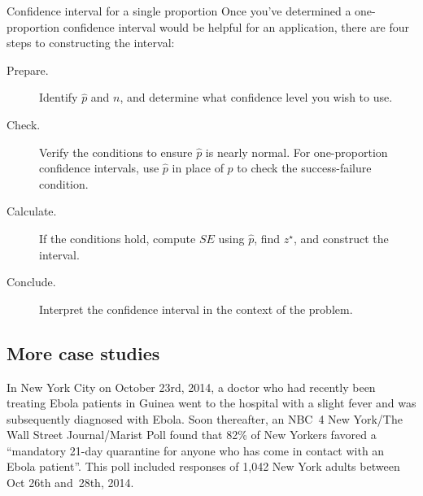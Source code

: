 \newcommand{\onepropconfintsummary}[0]{
\begin{onebox}{Confidence interval for a single proportion}
  Once you've determined a one-proportion confidence interval
  would be helpful for an application,
  there are four steps to constructing the interval:
  \begin{description}
  \item[Prepare.]
      Identify $\hat{p}$ and $n$, and determine what
      confidence level you wish to use.
  \item[Check.]
      Verify the conditions to ensure $\hat{p}$
      is nearly normal.
      For one-proportion confidence intervals,
      use $\hat{p}$ in place of $p$ to check
      the success-failure condition.
  \item[Calculate.]
      If the conditions hold, compute $SE$ using $\hat{p}$,
      find $z^{\star}$, and construct the interval.
  \item[Conclude.]
      Interpret the confidence interval in the context
      of the problem.
  \end{description}
\end{onebox}
}
\onepropconfintsummary{}


\D{\newpage}

\subsection{More case studies}


\newcommand{\wsjebolapollsize}{1042}
\newcommand{\wsjebolapollsizecomma}{1,042}
\newcommand{\wsjebolapollprop}{0.82}
\newcommand{\wsjebolapollpropcomplement}{0.18}
\newcommand{\wsjebolapollpercent}{82}
\newcommand{\wsjebolapollpercentcomplement}{18}
\newcommand{\wsjebolapollcount}{854}
\newcommand{\wsjebolapollcountcomplement}{188}
\newcommand{\wsjebolapollse}{0.012}


In New York City on October 23rd, 2014, a doctor who had recently been
treating Ebola patients in Guinea went to the hospital with a slight fever
and was subsequently diagnosed with Ebola. Soon thereafter,
an NBC~4 New York/The Wall Street Journal/Marist Poll found that
\wsjebolapollpercent{}\% of New Yorkers favored a ``mandatory 21-day
quarantine for anyone who has come in contact with an Ebola
patient''. This poll included responses
of \wsjebolapollsizecomma{} New York adults between
Oct 26th and~28th, 2014.

